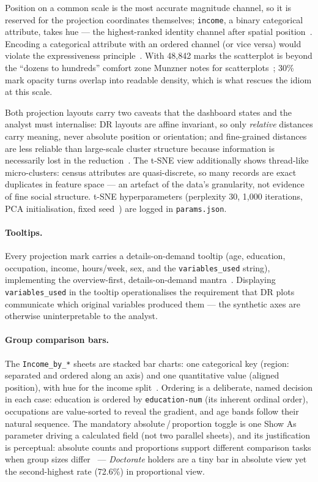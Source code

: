\documentclass[11pt,a4paper]{article}
\begin{document}
Position on a common scale is the most accurate magnitude channel, so it is
reserved for the projection coordinates themselves; \texttt{income}, a
binary categorical attribute, takes hue --- the highest-ranked identity
channel after spatial position~\cite[Fig.~5.6]{munzner}. Encoding a
categorical attribute with an ordered channel (or vice versa) would violate
the expressiveness principle~\cite[p.~100]{munzner}. With 48{,}842 marks the
scatterplot is beyond the ``dozens to hundreds'' comfort zone Munzner notes
for scatterplots~\cite[\S7.4]{munzner}; 30\% mark opacity turns overlap
into readable density, which is what rescues the idiom at this scale.

Both projection layouts carry two caveats that the dashboard states and the
analyst must internalise: DR layouts are affine invariant, so only
\emph{relative} distances carry meaning, never absolute position or
orientation; and fine-grained distances are less reliable than large-scale
cluster structure because information is necessarily lost in the
reduction~\cite[pp.~319--320]{munzner}. The t-SNE view additionally shows
thread-like micro-clusters: census attributes are quasi-discrete, so many
records are exact duplicates in feature space --- an artefact of the data's
granularity, not evidence of fine social structure. t-SNE hyperparameters
(perplexity 30, 1{,}000 iterations, PCA initialisation, fixed
seed~\cite{vandermaaten}) are logged in \texttt{params.json}.

\paragraph{Tooltips.}
Every projection mark carries a details-on-demand tooltip (age, education,
occupation, income, hours/week, sex, and the \texttt{variables\_used}
string), implementing the overview-first, details-on-demand
mantra~\cite{shneiderman}\cite[\S6.7]{munzner}. Displaying
\texttt{variables\_used} in the tooltip operationalises the requirement that
DR plots communicate which original variables produced them --- the
synthetic axes are otherwise uninterpretable to the analyst.

\paragraph{Group comparison bars.}
The \texttt{Income\_by\_*} sheets are stacked bar charts: one categorical
key (region: separated and ordered along an axis) and one quantitative
value (aligned position), with hue for the income
split~\cite[\S7.5]{munzner}. Ordering is a deliberate, named decision in
each case: education is ordered by \texttt{education-num} (its inherent
ordinal order), occupations are value-sorted to reveal the gradient, and
age bands follow their natural sequence. The mandatory
absolute\,/\,proportion toggle is one \textsf{Show As} parameter driving a
calculated field (not two parallel sheets), and its justification is
perceptual: absolute counts and proportions support different comparison
tasks when group sizes differ~\cite[\S5.6]{munzner} --- \textit{Doctorate}
holders are a tiny bar in absolute view yet the second-highest rate
(72.6\%) in proportional view.
\end{document}
